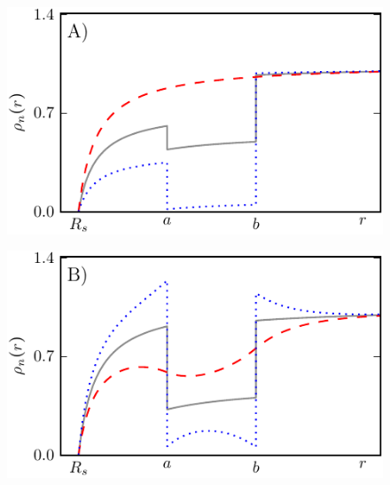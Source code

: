 \begin{minipage}[t]{0.5 \textwidth}
    \begin{figure}[H]
        \includegraphics[width = 1 \textwidth]{plots/d1.pdf}
    \end{figure}
\end{minipage}
\begin{minipage}[t]{0.5 \textwidth}
    \begin{figure}[H]
        \includegraphics[width = 1 \textwidth]{plots/d2.pdf}
    \end{figure}
\end{minipage}
